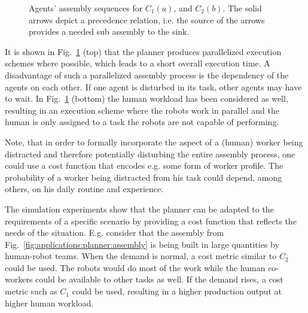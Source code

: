 \begin{figure}[ht!]
\begin{center}

\caption{Agents' assembly sequences for $C_1(a)$, and $C_2(b)$.
The solid arrows depict a precedence relation, i.e. the source of the arrows provides a needed sub assembly to the sink.}
\label{fig:applications:planner:sequences}
\end{center}
\end{figure}



It is shown in Fig.~\ref{fig:applications:planner:sequences} (top) that the planner produces parallelized execution schemes where possible, which leads to a short overall execution time.
A disadvantage of such a parallelized assembly process is the dependency of the agents on each other.
If one agent is disturbed in its task, other agents may have to wait.
In Fig.~\ref{fig:applications:planner:sequences} (bottom) the human workload has been considered as well, resulting in an execution scheme where the robots work in parallel and the human is only assigned to a task the robots are not capable of performing.

Note, that in order to formally incorporate the aspect of a (human) worker being distracted and therefore potentially disturbing the entire assembly process, one could use a cost function that encodes e.g. some form of worker profile.
The probability of a worker being distracted from his task could depend, among others, on his daily routine and experience.

The simulation experiments show that the planner can be adapted to the requirements of a specific scenario by providing a cost function that reflects the needs of the situation.
E.g. consider that the assembly from Fig.~\ref{fig:applications:planner:assembly} is being built in large quantities by human-robot teams.
When the demand is normal, a cost metric similar to $C_2$ could be used.
The robots would do most of the work while the human co-workers could be available to other tasks as well.
If the demand rises, a cost metric such as $C_1$ could be used, resulting in a higher production output at higher human workload.

